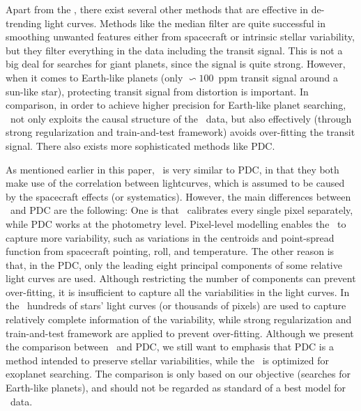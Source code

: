 Apart from the \name, there exist several other methods that are effective in de-trending light curves.
Methods like the median filter are quite successful in smoothing unwanted features either from spacecraft or intrinsic stellar variability, but they filter everything in the data including the transit signal. 
This is not a big deal for searches for giant planets, since the signal is quite strong. 
However, when it comes to Earth-like planets (only $\backsim 100$\ ppm transit signal around a sun-like star), protecting transit signal from distortion is important.
In comparison, in order to achieve higher precision for Earth-like planet searching, \name\  not only exploits the causal structure of the \Kepler\ data, but also  effectively (through strong regularization and train-and-test framework) avoids over-fitting the transit signal.
There also exists more sophisticated methods like PDC.

As mentioned earlier in this paper, \name\ is very similar to PDC, in that they both make use of the correlation between lightcurves, which is assumed to be caused by the spacecraft effects (or systematics).
However, the main differences between \name\ and PDC are the following:
One is that \name\ calibrates every single pixel separately, 
  while PDC works at the photometry level.
Pixel-level modelling enables the \name\ to capture more variability, such as 
variations in the centroids and point-spread function from spacecraft pointing, roll, and temperature.
The other reason is that, in the PDC,  only the leading eight principal components of some relative light curves are used.
Although restricting the number of components can prevent over-fitting, it is insufficient to capture all the variabilities in the light curves.
In the \name\, hundreds of stars' light curves (or thousands of pixels) are used to capture relatively complete information of the variability, while strong regularization and train-and-test framework are applied to prevent over-fitting.
Although we present the comparison between \name\ and PDC, 
  we still want to emphasis that PDC is a method intended to preserve stellar variabilities, 
  while the \name\ is optimized for exoplanet searching. 
The comparison is only based on our objective (searches for Earth-like planets), 
  and should not be regarded as standard of a best model for \Kepler\ data.
  
